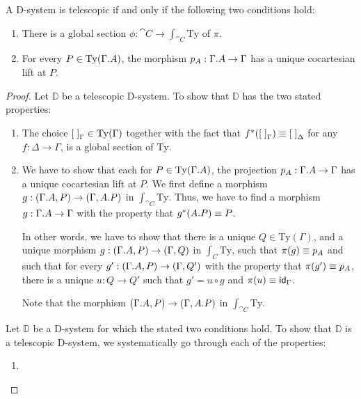 \begin{lem}
A D-system is telescopic if and only if  the following two conditions hold:
\begin{enumerate}
\item There is a global section $\phi:\cat{C}\to \int_{\cat{C}}\mathrm{Ty}$ of $\pi$.
\item For every $P\in\mathrm{Ty}(\ctxext{\Gamma}{A})$,
the morphism $p_A:\ctxext{\Gamma}{A}\to\Gamma$ has a unique cocartesian lift
at $P$.
\end{enumerate}
\end{lem}

\begin{proof}
Let $\mathbb{D}$ be a telescopic D-system. To show that $\mathbb{D}$ has the two
stated properties:
\begin{enumerate}
\item The choice $\emptyf[\Gamma]\in\mathrm{Ty}(\Gamma)$ together with the fact
that $f^\ast(\emptyf[\Gamma])\jdeq\emptyf[\Delta]$ for any $f:\Delta\to\Gamma$,
is a global section of $\mathrm{Ty}$. 
\item We have to show that each for $P\in\mathrm{Ty}(\ctxext{\Gamma}{A})$,
the projection $p_A:\ctxext{\Gamma}{A}\to\Gamma$ has a unique cocartesian lift
at $P$. We first define a morphism $g:(\ctxext{\Gamma}{A},P)\to(\Gamma,\ctxext{A}{P})$
in $\int_{\cat{C}}\mathrm{Ty}$. Thus, we have to find a morphism
$g:\ctxext{\Gamma}{A}\to\Gamma$ with the property that $g^\ast(\ctxext{A}{P})
\jdeq P$. 

In other words, we have to show that there is a unique 
$Q\in\mathrm{Ty}(\Gamma)$, and a unique morphism $g:(\ctxext{\Gamma}{A},P)\to
(\Gamma,Q)$ in $\int_C\mathrm{Ty}$, such that $\pi(g)\jdeq p_A$ and such that
for every $g':(\ctxext{\Gamma}{A},P)\to(\Gamma,Q')$ with the property that
$\pi(g')\jdeq p_A$, there is a unique $u:Q\to Q'$ such that $g'=u\circ g$ and
$\pi(u)\jdeq\idfunc[\Gamma]$. 

Note that the morphism $(\ctxext{\Gamma}{A},P)\to (\Gamma,\ctxext{A}{P})$
in $\int_{\cat{C}}\mathrm{Ty}$.  
\end{enumerate}

Let $\mathbb{D}$ be a D-system for which the stated two conditions hold. To show
that $\mathbb{D}$ is a telescopic D-system, we systematically go through each of the
properties:
\begin{enumerate}
\item 
\end{enumerate} 
\end{proof}

